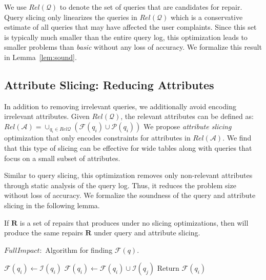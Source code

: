 We use $Rel\mathcal{(Q)}$ to denote the set of
queries that are candidates for repair.
Query slicing only linearizes the queries in $Rel\mathcal{(Q)}$ which
is a conservative estimate of all queries that may have affected the user
complaints. Since this set is typically much smaller than the entire query
log, this optimization leads to smaller problems than \emph{basic} without any
loss of accuracy.  We formalize this result in Lemma~\ref{lem:sound}.

\subsection{Attribute Slicing: Reducing Attributes}\label{sec:opt:attslice}

In addition to removing irrelevant queries, we additionally avoid encoding irrelevant attributes.
Given $Rel\mathcal{(Q)}$, the relevant attributes can be defined as:
$Rel\mathcal{(A)} = \cup_{q_i \in Rel\mathcal{Q}} (\mathcal{F}(q_i)\cup \mathcal{P}(q_i))$
We propose \emph{attribute slicing} optimization that only encodes constraints for attributes in $Rel\mathcal{(A)}$.
We find that this type of slicing can be effective for wide tables along with queries that focus on a small subset of attributes.  

Similar to query slicing, this optimization removes only non-relevant
attributes through static analysis of the query log. Thus, it reduces the problem
size without loss of accuracy. We formalize the soundness of the query and
attribute slicing in the following lemma.
% 
\begin{lemma}\label{lem:sound}
    If $\mathbf{R}$ is a set of repairs that \sys produces under no slicing
    optimizations, then \sys will produce the same repairs $\mathbf{R}$ under
    query and attribute slicing.
\end{lemma}


\begin{algorithm}[t]
\scriptsize
\caption{$FullImpact:$ Algorithm for finding $\mathcal{F}(q)$.}
\label{alg:fullimpact}
\begin{algorithmic}[2]
\STATE $\mathcal{F}(q_i) \leftarrow \mathcal{I}(q_i)$
\STATE $\mathcal{F}(q_i) \leftarrow \mathcal{F}(q_i) \cup \mathcal{I}(q_j)$
\ENDIF
\ENDFOR
\STATE Return $\mathcal{F}(q_i)$
\end{algorithmic}
\end{algorithm}

